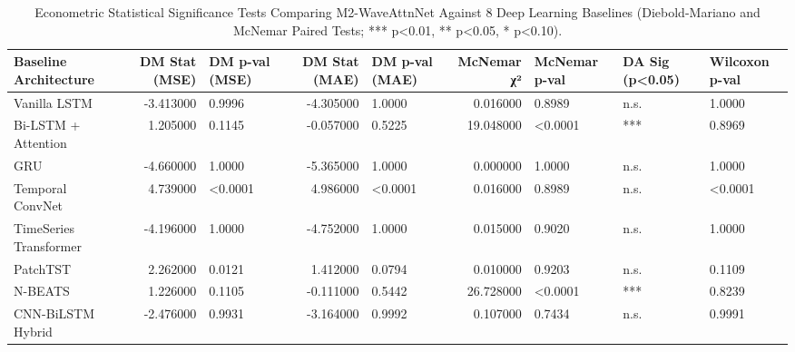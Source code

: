 \begin{table}
\caption{Econometric Statistical Significance Tests Comparing M2-WaveAttnNet Against 8 Deep Learning Baselines (Diebold-Mariano and McNemar Paired Tests; *** p<0.01, ** p<0.05, * p<0.10).}
\label{tab:stat_significance}
\begin{tabular}{lrlrlrlll}
\toprule
Baseline Architecture & DM Stat (MSE) & DM p-val (MSE) & DM Stat (MAE) & DM p-val (MAE) & McNemar χ² & McNemar p-val & DA Sig (p<0.05) & Wilcoxon p-val \\
\midrule
Vanilla LSTM & -3.413000 & 0.9996 & -4.305000 & 1.0000 & 0.016000 & 0.8989 & n.s. & 1.0000 \\
Bi-LSTM + Attention & 1.205000 & 0.1145 & -0.057000 & 0.5225 & 19.048000 & <0.0001 & *** & 0.8969 \\
GRU & -4.660000 & 1.0000 & -5.365000 & 1.0000 & 0.000000 & 1.0000 & n.s. & 1.0000 \\
Temporal ConvNet & 4.739000 & <0.0001 & 4.986000 & <0.0001 & 0.016000 & 0.8989 & n.s. & <0.0001 \\
TimeSeries Transformer & -4.196000 & 1.0000 & -4.752000 & 1.0000 & 0.015000 & 0.9020 & n.s. & 1.0000 \\
PatchTST & 2.262000 & 0.0121 & 1.412000 & 0.0794 & 0.010000 & 0.9203 & n.s. & 0.1109 \\
N-BEATS & 1.226000 & 0.1105 & -0.111000 & 0.5442 & 26.728000 & <0.0001 & *** & 0.8239 \\
CNN-BiLSTM Hybrid & -2.476000 & 0.9931 & -3.164000 & 0.9992 & 0.107000 & 0.7434 & n.s. & 0.9991 \\
\bottomrule
\end{tabular}
\end{table}
